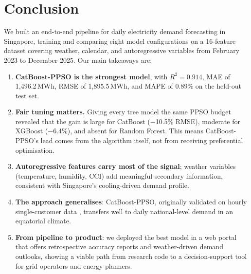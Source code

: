 \section{Conclusion}\label{sec:conclusion}

We built an end-to-end pipeline for daily electricity demand forecasting in Singapore, training and comparing eight model configurations on a 16-feature dataset covering weather, calendar, and autoregressive variables from February 2023 to December 2025. Our main takeaways are:

\begin{enumerate}
    \item \textbf{CatBoost-PPSO is the strongest model}, with $R^2 = 0.914$, MAE of 1{,}496.2\,MWh, RMSE of 1{,}895.5\,MWh, and MAPE of 0.89\% on the held-out test set.
    \item \textbf{Fair tuning matters.} Giving every tree model the same PPSO budget revealed that the gain is large for CatBoost ($-$10.5\% RMSE), moderate for XGBoost ($-$6.4\%), and absent for Random Forest. This means CatBoost-PPSO's lead comes from the algorithm itself, not from receiving preferential optimisation.
    \item \textbf{Autoregressive features carry most of the signal}; weather variables (temperature, humidity, CCI) add meaningful secondary information, consistent with Singapore's cooling-driven demand profile.
    \item \textbf{The approach generalises}: CatBoost-PPSO, originally validated on hourly single-customer data \parencite{zhang2023catboostppso}, transfers well to daily national-level demand in an equatorial climate.
    \item \textbf{From pipeline to product}: we deployed the best model in a web portal that offers retrospective accuracy reports and weather-driven demand outlooks, showing a viable path from research code to a decision-support tool for grid operators and energy planners.
\end{enumerate}
